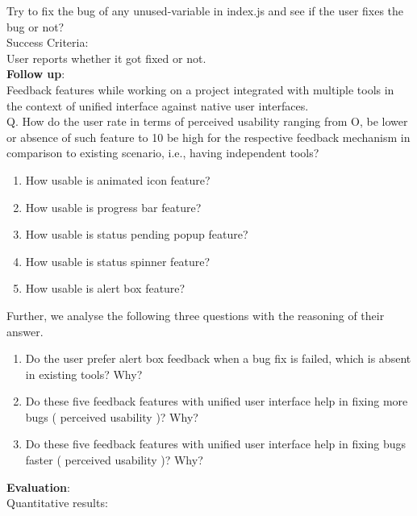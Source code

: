 Try to fix the bug of any unused-variable in index.js and see if the user fixes the bug or not? \\


Success Criteria: \\

User reports whether it got fixed or not. \\

\textbf{Follow up}: \\

Feedback features while working on a project integrated with multiple tools in the context of unified interface against native user interfaces. \\

Q. How do the user rate in terms of perceived usability ranging from O, be lower or absence of such feature to 10 be high for the respective feedback mechanism in comparison to existing scenario, i.e., having independent tools? \\
\begin{enumerate}
\item  How usable is animated icon feature? 
\item  How usable is progress bar feature? 
\item  How usable is status pending popup feature? 
\item  How usable is status spinner feature? 
\item  How usable is alert box feature? \\
\end{enumerate}

Further, we analyse the following three questions with the reasoning of their answer. \\

\begin{enumerate}
\item Do the user prefer alert box feedback when a bug fix is failed, which is absent in existing tools? Why?
\item Do these five feedback features with unified user interface help in fixing more bugs ( perceived usability )? Why?
\item Do these five feedback features with unified user interface help in fixing bugs faster ( perceived usability )? Why? \\
\end{enumerate}

\textbf{Evaluation}: \\

Quantitative results: \\

